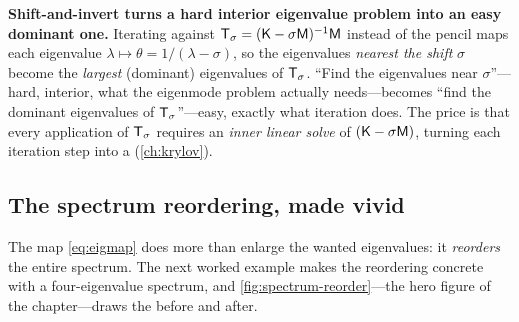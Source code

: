 \begin{keyidea}
\textbf{Shift-and-invert turns a hard interior eigenvalue problem into an easy
dominant one.} Iterating against $\mathsf{T}_\sigma=(\mathsf{K}-\sigma\mathsf{M})^{-1}\mathsf{M}$
instead of the pencil maps each eigenvalue $\lambda\mapsto\theta=1/(\lambda
-\sigma)$, so the eigenvalues \emph{nearest the shift} $\sigma$ become the
\emph{largest} (dominant) eigenvalues of $\mathsf{T}_\sigma$. ``Find the eigenvalues
near $\sigma$''---hard, interior, what the eigenmode problem actually
needs---becomes ``find the dominant eigenvalues of $\mathsf{T}_\sigma$''---easy,
exactly what iteration does. The price is that every application of
$\mathsf{T}_\sigma$ requires an \emph{inner linear solve} of $(\mathsf{K}-\sigma\mathsf{M})$,
turning each iteration step into a  (\cref{ch:krylov}).
\end{keyidea}

\subsection{The spectrum reordering, made vivid}

The map \cref{eq:eigmap} does more than enlarge the wanted eigenvalues: it
\emph{reorders} the entire spectrum. The next worked example makes the reordering
concrete with a four-eigenvalue spectrum, and \cref{fig:spectrum-reorder}---the
hero figure of the chapter---draws the before and after.

